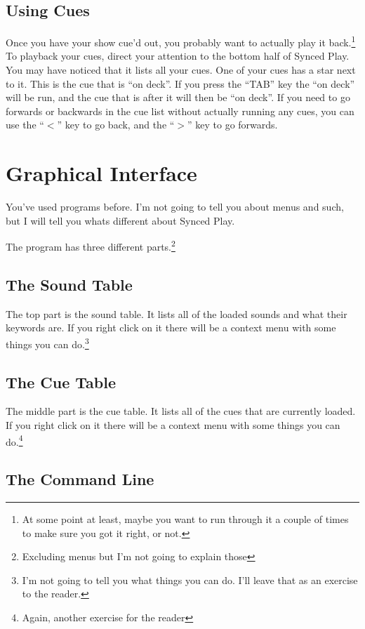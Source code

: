 \documentclass{article}
\begin{document}
\subsection{Using Cues}

Once you have your show cue'd out, you probably want to actually play it
back.\footnote{At some point at least, maybe you want to run through it
a couple of times to make sure you got it right, or not.} To playback
your cues, direct your attention to the bottom half of Synced Play. You
may have noticed that it lists all your cues. One of your cues has a star
next to it. This is the cue that is ``on deck''. If you press the ``TAB'' key
the ``on deck'' will be run, and the cue that is after it will then be
``on deck''. If you need to go forwards or backwards in the cue list without
actually running any cues, you can use the ``$<$'' key to go back, and the
``$>$'' key to go forwards.

\newpage

\section{Graphical Interface}

You've used programs before. I'm not going to tell you about menus and
such, but I will tell you whats different about Synced Play.

The program has three different parts.\footnote{Excluding menus but I'm not
going to explain those}

\subsection{The Sound Table}

The top part is the sound table. It lists all of
the loaded sounds and what their keywords are. If you right click on it
there will be a context menu with some things you can do.\footnote{I'm
not going to tell you what things you can do. I'll leave that as an exercise
to the reader.}

\subsection{The Cue Table}

The middle part is the cue table. It lists all of the cues that are
currently loaded. If you right click on it there will be a context menu
with some things you can do.\footnote{Again, another exercise for the reader}

\subsection{The Command Line}
\end{document}
